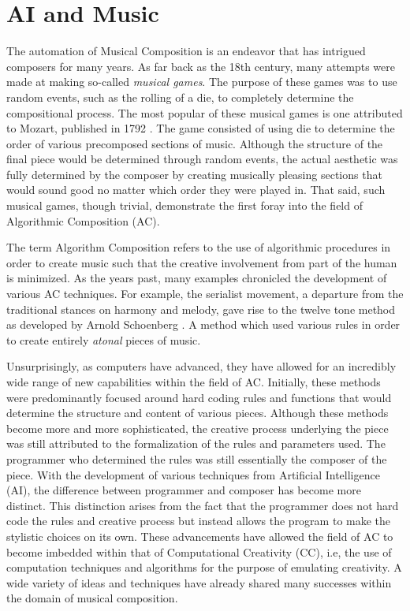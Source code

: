 \documentclass[master.tex]{subfiles} %
\begin{document}
\section{AI and Music}

The automation of Musical Composition is an endeavor that has intrigued composers for many years. As far back as the 18th century, many attempts were made at making so-called \emph{musical games}. The purpose of these games was to use random events, such as the rolling of a die, to completely determine the compositional process. The most popular of these musical games is one attributed to Mozart, published in 1792 . The game consisted of using die to determine the order of various precomposed sections of music. Although the structure of the final piece would be determined through random events, the actual aesthetic was fully determined by the composer by creating musically pleasing sections that would sound good no matter which order they were played in. That said, such musical games, though trivial, demonstrate the first foray into the field of Algorithmic Composition (AC). 

The term Algorithm Composition refers to the use of algorithmic procedures in order to create music such that the creative involvement from part of the human is minimized. As the years past, many examples chronicled the development of various AC techniques. For example, the serialist movement, a departure from the traditional stances on harmony and melody, gave rise to the twelve tone method as developed by Arnold Schoenberg . A method which used various rules in order to create entirely \emph{atonal} pieces of music.

Unsurprisingly, as computers have advanced, they have allowed for an incredibly wide range of new capabilities within the field of AC. Initially, these methods were predominantly focused around hard coding rules and functions that would determine the structure and content of various pieces. Although these methods become more and more sophisticated, the creative process underlying the piece was still attributed to the formalization of the rules and parameters used. The programmer who determined the rules was still essentially the composer of the piece. With the development of various techniques from Artificial Intelligence (AI), the difference between programmer and composer has become more distinct. This distinction arises from the fact that the programmer does not hard code the rules and creative process but instead allows the program to make the stylistic choices on its own. These advancements have allowed the field of AC to become imbedded within that of Computational Creativity (CC), i.e, the use of computation techniques and algorithms for the purpose of emulating creativity. A wide variety of ideas and techniques have already shared many successes within the domain of musical composition.
\end{document}

